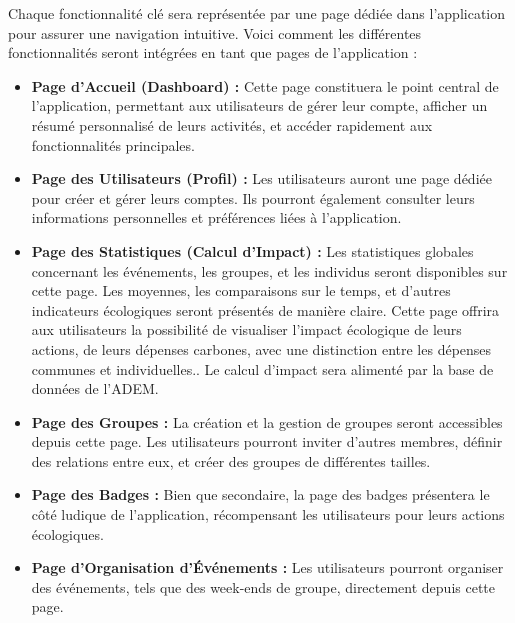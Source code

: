 
Chaque fonctionnalité clé sera représentée par une page dédiée dans l'application pour assurer une navigation intuitive. Voici comment les différentes fonctionnalités seront intégrées en tant que pages de l'application :

\begin{itemize}[label=-]
    \item \textbf{Page d'Accueil (Dashboard) :} Cette page constituera le point central de l'application, permettant aux utilisateurs de gérer leur compte, afficher un résumé personnalisé de leurs activités, et accéder rapidement aux fonctionnalités principales.

    \item \textbf{Page des Utilisateurs (Profil) :} Les utilisateurs auront une page dédiée pour créer et gérer leurs comptes. Ils pourront également consulter leurs informations personnelles et préférences liées à l'application.

    \item \textbf{Page des Statistiques (Calcul d'Impact) :} Les statistiques globales concernant les événements, les groupes, et les individus seront disponibles sur cette page. Les moyennes, les comparaisons sur le temps, et d'autres indicateurs écologiques seront présentés de manière claire. Cette page offrira aux utilisateurs la possibilité de visualiser l'impact écologique de leurs actions, de leurs dépenses carbones, avec une distinction entre les dépenses communes et individuelles.. Le calcul d'impact sera alimenté par la base de données de l'ADEM. 

    \item \textbf{Page des Groupes :} La création et la gestion de groupes seront accessibles depuis cette page. Les utilisateurs pourront inviter d'autres membres, définir des relations entre eux, et créer des groupes de différentes tailles.

    \item \textbf{Page des Badges :} Bien que secondaire, la page des badges présentera le côté ludique de l'application, récompensant les utilisateurs pour leurs actions écologiques.

    \item \textbf{Page d'Organisation d'Événements :} Les utilisateurs pourront organiser des événements, tels que des week-ends de groupe, directement depuis cette page.

\end{itemize}

